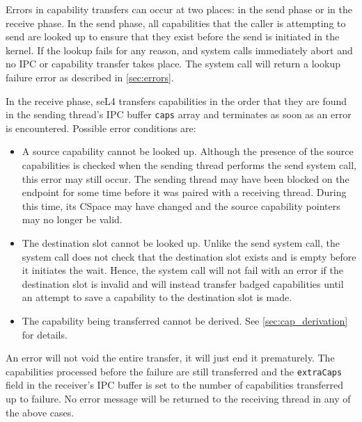 Errors in capability transfers can occur at two places: in the send
phase or in the receive phase. In the send phase, all capabilities that
the caller is attempting to send are looked up to ensure that they exist
before the send is initiated in the kernel. If the lookup fails for any
reason,  and  system calls immediately abort and
no IPC or capability transfer takes place. The system call will return
a lookup failure error as described in \autoref{sec:errors}.

In the receive phase, seL4 transfers capabilities in the order that they
are found in the sending thread's IPC buffer \texttt{caps} array
and terminates as soon as an error is encountered. Possible error
conditions are:

\begin{itemize}
    \item A source capability cannot be looked up. Although the presence
    of the source capabilities is checked when the sending thread
    performs the send system call, this error may still occur. The sending
    thread may have been blocked on the endpoint for some time before it
    was paired with a receiving thread. During this time, its
    CSpace may have changed and the source capability pointers may
    no longer be valid.

    \item The destination slot cannot be looked up. Unlike the send
    system call, the  system call does not check that the
    destination slot exists and is empty before it initiates the wait.
    Hence, the  system call will not fail with an error if the
    destination slot is invalid and will instead transfer badged
    capabilities until an attempt to save a capability to the
    destination slot is made.

    \item The capability being transferred cannot be derived. See
    \autoref{sec:cap_derivation} for details.
\end{itemize}

An error will not void the entire transfer, it will just end it
prematurely. The capabilities processed before the failure are still
transferred and the \texttt{extraCaps} field in the receiver's IPC
buffer is set to the number of capabilities transferred up to failure.
No error message will be returned to the receiving thread in any of the
above cases.

